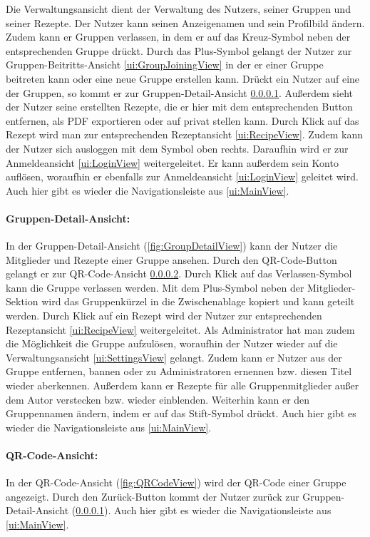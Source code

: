 \documentclass[parskip=full]{scrartcl}
\begin{document}
Die Verwaltungsansicht dient der Verwaltung des Nutzers, seiner Gruppen und seiner Rezepte. Der Nutzer kann seinen Anzeigenamen und sein Profilbild ändern. Zudem kann er Gruppen verlassen, in dem er auf das Kreuz-Symbol neben der entsprechenden Gruppe drückt. Durch das Plus-Symbol gelangt der Nutzer zur Gruppen-Beitritts-Ansicht \ref{ui:GroupJoiningView} in der er einer Gruppe beitreten kann oder eine neue Gruppe erstellen kann. Drückt ein Nutzer auf eine der Gruppen, so kommt er zur Gruppen-Detail-Ansicht \ref{ui:GroupDetailView}. Außerdem sieht der Nutzer seine erstellten Rezepte, die er hier mit dem entsprechenden Button entfernen, als PDF exportieren oder auf privat stellen kann. Durch Klick auf das Rezept wird man zur entsprechenden Rezeptansicht \ref{ui:RecipeView}.
Zudem kann der Nutzer sich ausloggen mit dem Symbol oben rechts. Daraufhin wird er zur Anmeldeansicht \ref{ui:LoginView} weitergeleitet. Er kann außerdem sein Konto auflösen, woraufhin er ebenfalls zur Anmeldeansicht \ref{ui:LoginView} geleitet wird. Auch hier gibt es wieder die Navigationsleiste aus \ref{ui:MainView}.

\paragraph{Gruppen-Detail-Ansicht:}
\label{ui:GroupDetailView}
In der Gruppen-Detail-Ansicht (\autoref{fig:GroupDetailView}) kann der Nutzer die Mitglieder und Rezepte einer Gruppe ansehen. Durch den QR-Code-Button gelangt er zur QR-Code-Ansicht \ref{ui:QRCodeView}. Durch Klick auf das Verlassen-Symbol kann die Gruppe verlassen werden. Mit dem Plus-Symbol neben der Mitglieder-Sektion wird das Gruppenkürzel in die Zwischenablage kopiert und kann geteilt werden. Durch Klick auf ein Rezept wird der Nutzer zur entsprechenden Rezeptansicht \ref{ui:RecipeView} weitergeleitet. Als Administrator hat man zudem die Möglichkeit die Gruppe aufzulösen, woraufhin der Nutzer wieder auf die Verwaltungsansicht \ref{ui:SettingsView} gelangt. Zudem kann er Nutzer aus der Gruppe entfernen, bannen oder zu Administratoren ernennen bzw. diesen Titel wieder aberkennen. Außerdem kann er Rezepte für alle Gruppenmitglieder außer dem Autor verstecken bzw. wieder einblenden. Weiterhin kann er den Gruppennamen ändern, indem er auf das Stift-Symbol drückt. Auch hier gibt es wieder die Navigationsleiste aus \ref{ui:MainView}.

\paragraph{QR-Code-Ansicht:}
\label{ui:QRCodeView}
In der QR-Code-Ansicht (\autoref{fig:QRCodeView}) wird der QR-Code einer Gruppe angezeigt. Durch den Zurück-Button kommt der Nutzer zurück zur Gruppen-Detail-Ansicht (\ref{ui:GroupDetailView}). Auch hier gibt es wieder die Navigationsleiste aus \ref{ui:MainView}.
\newpage
\end{document}

